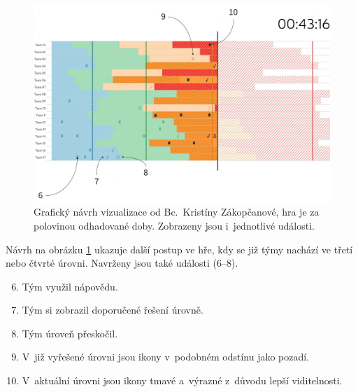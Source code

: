 \documentclass[
  digital, %
  oneside, %
  table,   %
  nolof,     %
  nolot,     %
]{fithesis3}
\begin{document}
\begin{figure}[H]
  \begin{center}
    \includegraphics[width=12.7cm]{images/navrh-vizualizace-2-4.png}
  \end{center}
  \caption{Grafický návrh vizualizace od Bc.~Kristíny Zákopčanové, hra je za polovinou odhadované doby. Zobrazeny jsou i~jednotlivé události.}
  \label{fig:progress2}
\end{figure}
Návrh na obrázku \ref{fig:progress2} ukazuje další postup ve hře, kdy se již týmy nachází ve třetí nebo čtvrté úrovni. Navrženy jsou také události (6–8).
\begin{enumerate}
  \setcounter{enumi}{5}
  \item Tým využil nápovědu.
  \item Tým si zobrazil doporučené řešení úrovně.
  \item Tým úroveň přeskočil.
  \item V~již vyřešené úrovni jsou ikony v~podobném odstínu jako pozadí.
  \item V~aktuální úrovni jsou ikony tmavé a~výrazné z~důvodu lepší viditelnosti.
\end{enumerate}
\end{document}
